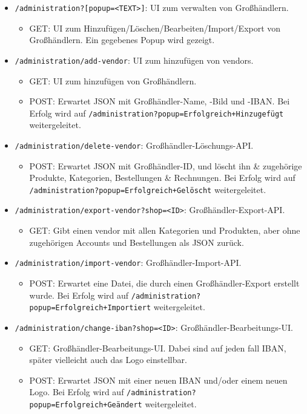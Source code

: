 \begin{itemize}
	\item \texttt{/administration?[popup=<TEXT>]}: UI zum verwalten von Großhändlern.
		\begin{itemize}
			\item GET: UI zum Hinzufügen/Löschen/Bearbeiten/Import/Export von Großhändlern. Ein gegebenes Popup wird gezeigt.
		\end{itemize}
	\item \texttt{/administration/add-vendor}: UI zum hinzufügen von vendors.
		\begin{itemize}
			\item GET: UI zum hinzufügen von Großhändlern.
			\item POST: Erwartet JSON mit Großhändler-Name, -Bild und -IBAN. Bei Erfolg wird auf \texttt{/administration?popup=Erfolgreich+Hinzugefügt} weitergeleitet.
		\end{itemize}
	\item \texttt{/administration/delete-vendor}: Großhändler-Löschungs-API.
		\begin{itemize}
			\item POST: Erwartet JSON mit Großhändler-ID, und löscht ihn \& zugehörige Produkte, Kategorien, Bestellungen \& Rechnungen. Bei Erfolg wird auf \texttt{/administration?popup=Erfolgreich+Gelöscht} weitergeleitet.
		\end{itemize}
	\item \texttt{/administration/export-vendor?shop=<ID>}: Großhändler-Export-API.
		\begin{itemize}
			\item GET: Gibt einen vendor mit allen Kategorien und Produkten, aber ohne zugehörigen Accounts und Bestellungen als JSON zurück.
		\end{itemize}
	\item \texttt{/administration/import-vendor}: Großhändler-Import-API.
		\begin{itemize}
			\item POST: Erwartet eine Datei, die durch einen Großhändler-Export erstellt wurde. Bei Erfolg wird auf \texttt{/administration?popup=Erfolgreich+Importiert} weitergeleitet.
		\end{itemize}
	\item \texttt{/administration/change-iban?shop=<ID>}: Großhändler-Bearbeitungs-UI.
		\begin{itemize}
			\item GET: Großhändler-Bearbeitungs-UI. Dabei sind auf jeden fall IBAN, später vielleicht auch das Logo einstellbar.
			\item POST: Erwartet JSON mit einer neuen IBAN und/oder einem neuen Logo. Bei Erfolg wird auf \texttt{/administration?popup=Erfolgreich+Geändert} weitergeleitet.
		\end{itemize}
\end{itemize}


